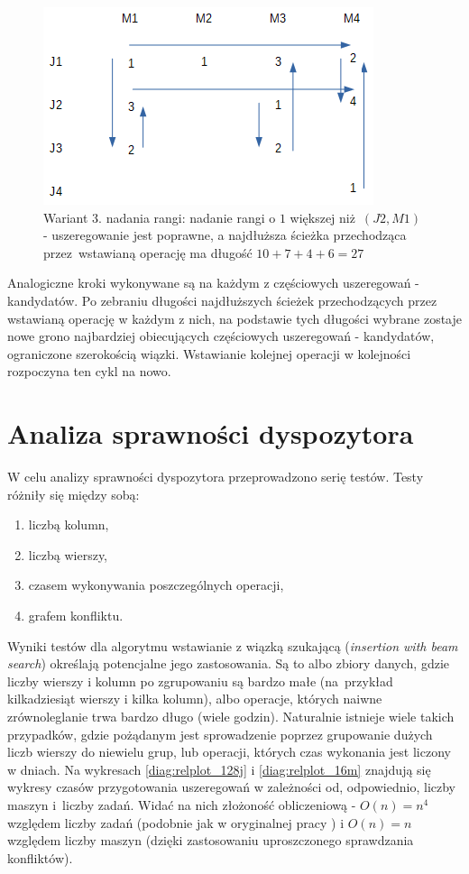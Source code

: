 \documentclass[brudnopis]{xmgr}
\begin{document}
\begin{figure}[!tbh]
\centering
\includegraphics[width=.7\hsize]{fig/4.png}
\caption{Wariant 3. nadania rangi: nadanie rangi o $1$ większej niż~$(J2, M1)$ - uszeregowanie jest poprawne, a najdłuższa ścieżka przechodząca przez~wstawianą operację ma długość $10 + 7 + 4 + 6 = 27$\label{diag:state4}}
\end{figure}\medskip

Analogiczne kroki wykonywane są na każdym z częściowych uszeregowań - kandydatów.
Po zebraniu długości najdłuższych ścieżek przechodzących przez wstawianą operację w każdym z nich, na podstawie tych długości wybrane zostaje nowe grono najbardziej obiecujących częściowych uszeregowań - kandydatów, ograniczone szerokością wiązki.
Wstawianie kolejnej operacji w kolejności rozpoczyna ten cykl na nowo.



\chapter{Analiza sprawności dyspozytora}

W celu analizy sprawności dyspozytora przeprowadzono serię testów.
Testy różniły się między sobą:
\begin{enumerate}
    \item liczbą kolumn,
    \item liczbą wierszy,
    \item czasem wykonywania poszczególnych operacji,
    \item grafem konfliktu.
\end{enumerate}

Wyniki testów dla algorytmu wstawianie z wiązką szukającą (\emph{insertion with beam search}) określają potencjalne jego zastosowania. Są to albo zbiory danych, gdzie liczby wierszy i kolumn po zgrupowaniu są bardzo małe (na~przykład kilkadziesiąt wierszy i kilka kolumn), albo operacje, których naiwne zrównoleglanie trwa bardzo długo (wiele godzin). Naturalnie istnieje wiele takich przypadków, gdzie pożądanym jest sprowadzenie poprzez grupowanie dużych liczb wierszy do niewielu grup, lub operacji, których czas wykonania jest liczony w dniach. Na wykresach \ref{diag:relplot_128j} i \ref{diag:relplot_16m} znajdują się wykresy czasów przygotowania uszeregowań w zależności od, odpowiednio, liczby maszyn i~liczby zadań. Widać na nich złożoność obliczeniową - $O(n)=n^4$ względem liczby zadań (podobnie jak w oryginalnej pracy \cite{brasel1993constructive}) i $O(n)=n$ względem liczby maszyn (dzięki zastosowaniu uproszczonego sprawdzania konfliktów).
\end{document}
